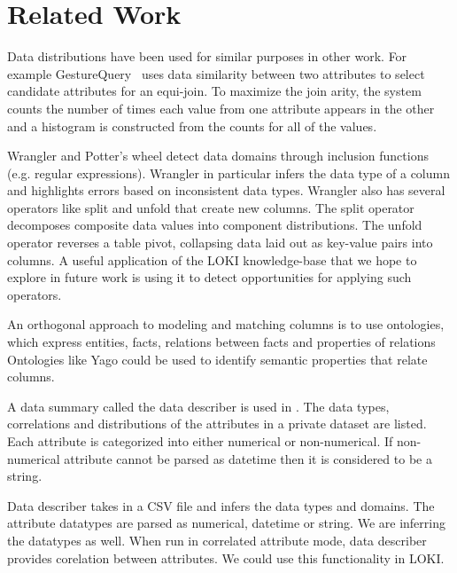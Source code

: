 \documentclass{vldb}
\begin{document}
\section{Related Work}
Data distributions have been used for similar purposes in other work.  
For example GestureQuery~\cite{nandi2013gestural} uses data similarity between two attributes to select candidate attributes for an equi-join.  
To maximize the join arity, the system counts the number of times each value from one attribute appears in the other and a histogram is constructed from the counts for all of the values.

Wrangler \cite{kandel2011wrangler} and Potter's wheel \cite{raman2001potter} detect data domains through inclusion functions (e.g. regular expressions).
Wrangler in particular infers the data type of a column and highlights errors based on inconsistent data types. 
Wrangler also has several operators like split and unfold that create new columns.
The split operator decomposes composite data values into component distributions.  
The unfold operator reverses a table pivot, collapsing data laid out as key-value pairs into columns.  
A useful application of the LOKI knowledge-base that we hope to explore in future work is using it to detect opportunities for applying such operators.

An orthogonal approach to modeling and matching columns is to use ontologies, which express entities, facts, relations between facts and properties of relations
Ontologies like Yago \cite{fabian2007yago} could be used to identify semantic properties that relate columns.

A data summary called the data describer is used in \cite{ping2017datasynthesizer}. The data types, correlations and distributions of the attributes in a private dataset are listed. Each attribute is categorized into either numerical or non-numerical. If non-numerical attribute cannot be parsed as datetime then it is considered to be a string.

Data describer takes in a CSV file and infers the data types and domains. The attribute datatypes are parsed as numerical, datetime or string. We are inferring the datatypes as well. When run in correlated attribute mode, data describer provides corelation between attributes. We could use this functionality in LOKI.
\end{document}
